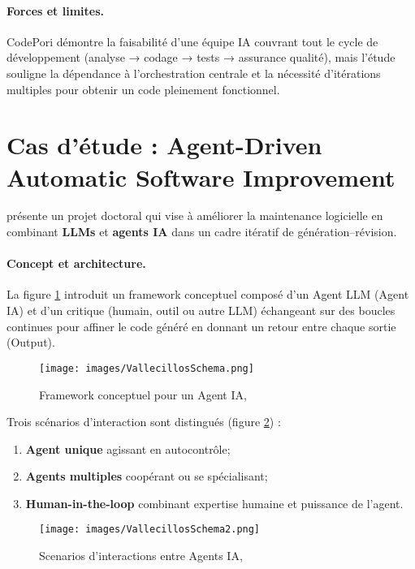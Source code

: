 \paragraph{Forces et limites.}
CodePori démontre la faisabilité d’une équipe IA couvrant tout le cycle de développement (analyse → codage → tests → assurance qualité), mais l’étude souligne la dépendance à l’orchestration centrale et la nécessité d’itérations multiples pour obtenir un code pleinement fonctionnel.

\section{Cas d’étude : Agent-Driven Automatic Software Improvement}

\textcite{vallecillos_ruiz_agent-driven_2024} présente un projet doctoral qui vise à améliorer la maintenance logicielle en combinant \textbf{LLMs} et \textbf{agents IA} dans un cadre itératif de génération–révision.

\paragraph{Concept et architecture.}
La figure \ref{fig:schemaVallecillos} introduit un framework conceptuel composé d’un Agent LLM (Agent IA) et d’un critique (humain, outil ou autre LLM) échangeant sur des boucles continues pour affiner le code généré en donnant un retour entre chaque sortie (Output).  
\begin{figure}[H]
    \centering
    \texttt{[image: images/VallecillosSchema.png]}
    \caption{Framework conceptuel pour un Agent IA, \parencite{vallecillos_ruiz_agent-driven_2024}}
    \label{fig:schemaVallecillos}
\end{figure}

Trois scénarios d’interaction sont distingués (figure \ref{fig:schema2Vallecillos}) :  
\begin{enumerate}
  \item \textbf{Agent unique} agissant en autocontrôle;
  \item \textbf{Agents multiples} coopérant ou se spécialisant;
  \item \textbf{Human-in-the-loop} combinant expertise humaine et puissance de l’agent.
\end{enumerate}

\begin{figure}[H]
    \centering
    \texttt{[image: images/VallecillosSchema2.png]}
    \caption{Scenarios d’interactions entre Agents IA, \parencite{vallecillos_ruiz_agent-driven_2024}}
    \label{fig:schema2Vallecillos}
\end{figure}

